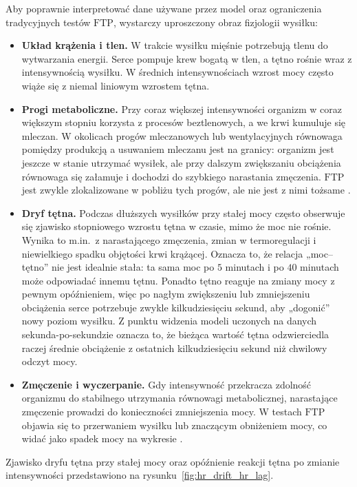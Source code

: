 Aby poprawnie interpretować dane używane przez model oraz ograniczenia tradycyjnych testów $\mathrm{FTP}$, wystarczy uproszczony obraz fizjologii wysiłku:
\begin{itemize}
  \item \textbf{Układ krążenia i tlen.} W trakcie wysiłku mięśnie potrzebują tlenu do wytwarzania energii. Serce pompuje krew bogatą w tlen, a tętno rośnie wraz z intensywnością wysiłku. W średnich intensywnościach wzrost mocy często wiąże się z niemal liniowym wzrostem tętna.
  \item \textbf{Progi metaboliczne.} Przy coraz większej intensywności organizm w coraz większym stopniu korzysta z procesów beztlenowych, a we krwi kumuluje się mleczan. W okolicach progów mleczanowych lub wentylacyjnych równowaga pomiędzy produkcją a usuwaniem mleczanu jest na granicy: organizm jest jeszcze w stanie utrzymać wysiłek, ale przy dalszym zwiększaniu obciążenia równowaga się załamuje i dochodzi do szybkiego narastania zmęczenia. $\mathrm{FTP}$ jest zwykle zlokalizowane w pobliżu tych progów, ale nie jest z nimi tożsame \parencite{borszcz2018ftp,karsten2021cpftp,denham2020predictftp}.
  \item \textbf{Dryf tętna.} Podczas dłuższych wysiłków przy stałej mocy często obserwuje się zjawisko stopniowego wzrostu tętna w czasie, mimo że moc nie rośnie. Wynika to m.in.\ z narastającego zmęczenia, zmian w termoregulacji i niewielkiego spadku objętości krwi krążącej. Oznacza to, że relacja „moc--tętno” nie jest idealnie stała: ta sama moc po $5$ minutach i po $40$ minutach może odpowiadać innemu tętnu. Ponadto tętno reaguje na zmiany mocy z pewnym opóźnieniem, więc po nagłym zwiększeniu lub zmniejszeniu obciążenia serce potrzebuje zwykle kilkudziesięciu sekund, aby „dogonić” nowy poziom wysiłku. Z punktu widzenia modeli uczonych na danych sekunda-po-sekundzie oznacza to, że bieżąca wartość tętna odzwierciedla raczej średnie obciążenie z ostatnich kilkudziesięciu sekund niż chwilowy odczyt mocy.
  \item \textbf{Zmęczenie i wyczerpanie.} Gdy intensywność przekracza zdolność organizmu do stabilnego utrzymania równowagi metabolicznej, narastające zmęczenie prowadzi do konieczności zmniejszenia mocy. W testach $\mathrm{FTP}$ objawia się to przerwaniem wysiłku lub znaczącym obniżeniem mocy, co widać jako spadek mocy na wykresie \parencite{borszcz2018ftp,karsten2021cpftp}.
\end{itemize}

Zjawisko dryfu tętna przy stałej mocy oraz opóźnienie reakcji tętna po zmianie intensywności przedstawiono na rysunku~\ref{fig:hr_drift_hr_lag}.

